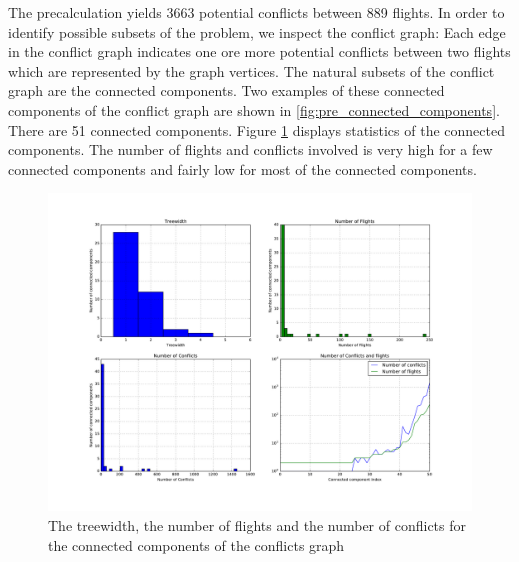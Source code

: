 \documentclass{article}
\begin{document}
The precalculation yields 3663 potential conflicts between 889 flights.
In order to identify possible subsets of the problem, we inspect the conflict graph: Each edge in the conflict graph indicates one ore more potential conflicts between two flights which are represented by the graph vertices.
The natural subsets of the conflict graph are the connected components.
Two examples of these connected components of the conflict graph are shown in \ref{fig:pre_connected_components}.
There are 51 connected components. 
Figure \ref{fig:pre_connected_components_statistics} displays statistics of the connected components.
The number of flights and conflicts involved is very high for a few connected components and fairly low for most of the connected components.
\begin{figure}[htpb]
    \centering
    \includegraphics[width=1.0\linewidth]{pics/conflict_graph_connected_components_analysis.pdf}
    \caption{The treewidth, the number of flights and the number of conflicts for the connected components of the conflicts graph}
    \label{fig:pre_connected_components_statistics}
\end{figure}
\end{document}
